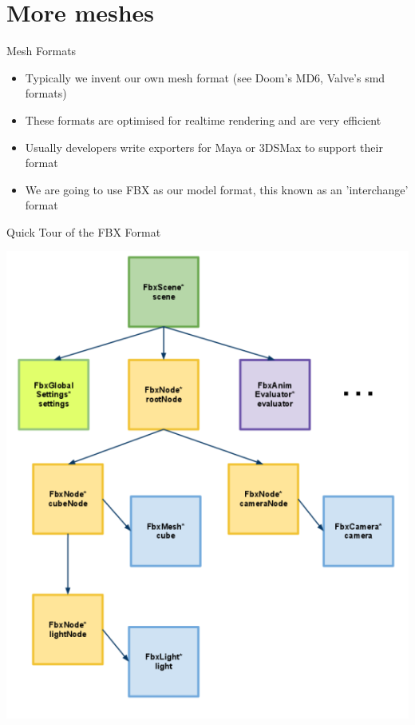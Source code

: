 \part{More meshes}
\frame{\partpage}

\begin{frame}{Mesh Formats}
	\begin{itemize}
		\item Typically we invent our own mesh format (see Doom's MD6, Valve's smd formats)
		\pause\item These formats are optimised for realtime rendering and are very efficient
		\pause\item Usually developers write exporters for Maya or 3DSMax to support their format
		\pause\item We are going to use FBX as our model format, this known as an 'interchange' format
	\end{itemize}
\end{frame}

\begin{frame}{Quick Tour of the FBX Format}
	\begin{center}
		\includegraphics[width=\textwidth,height=0.8\textheight]{scene_org}
	\end{center}
\end{frame}

